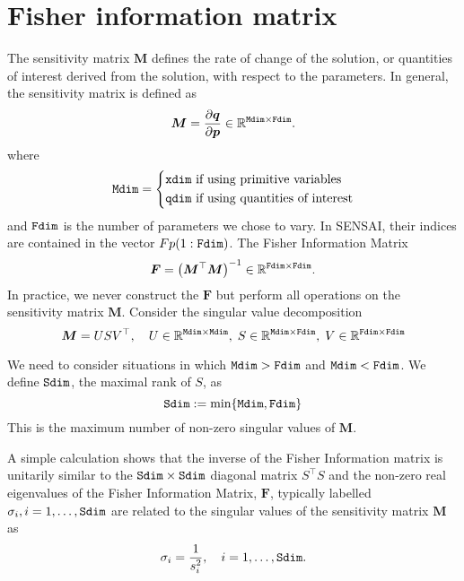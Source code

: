 \documentclass{siamltex}
\newcommand{\pvec}{\bm{p}}
\newcommand{\qvec}{\bm{q}}
\newcommand{\Fmat}{\bm{F}}
\newcommand{\Mmat}{\bm{M}}
\newcommand{\reals}{\mathbb R}
\newcommand{\xdim}{{\tt xdim}}
\newcommand{\qdim}{{\tt qdim}}
\newcommand{\Mdim}{{\tt Mdim}}
\newcommand{\Sdim}{{\tt Sdim}}
\newcommand{\Fdim}{{\tt Fdim}}
\begin{document}
\section{Fisher information matrix}
The sensitivity matrix $\Mmat$ defines the rate of change of the solution, or quantities of interest derived from the solution, with respect to the parameters. In general, the sensitivity matrix is defined as
\begin{equation}
\Mmat=\frac{\partial\qvec}{\partial\pvec} \in \reals^{\Mdim\times\Fdim}.
\end{equation}
where
\begin{equation}
\Mdim =
\left \{
\begin{gathered}\begin{aligned}
&\xdim \hbox{  if using primitive variables} \\
&\qdim \hbox{  if using quantities of interest}
\end{aligned}\end{gathered}
\right .
\end{equation}
and $\Fdim$ is the number of parameters we chose to vary. In SENSAI, their indices are contained in the vector $Fp(1:\Fdim)$. The Fisher Information Matrix
\begin{equation}
\Fmat = \left( \Mmat^\top \Mmat \right)^{-1} \in \reals^{\Fdim\times\Fdim}.
\end{equation}
In practice, we never construct the $\Fmat$ but perform all operations on the sensitivity matrix $\Mmat$. Consider the singular value decomposition
\begin{equation}
\Mmat=USV^\top, \quad U\in\reals^{\Mdim\times\Mdim},
\; S\in\reals^{\Mdim\times\Fdim}, \; V\in\reals^{\Fdim\times\Fdim}
\end{equation}

We need to consider situations in which $\Mdim > \Fdim$ and $\Mdim < \Fdim$. We define $\Sdim$, the maximal rank of $S$, as
\begin{equation}
\Sdim := \hbox{min} \{ \Mdim,\Fdim \}
\end{equation}
This is the maximum number of non-zero singular values of $\Mmat$.

A simple calculation shows that the inverse of the Fisher Information matrix is unitarily similar to the $\Sdim \times \Sdim$ diagonal matrix $S^\top S$  and the non-zero real eigenvalues of the Fisher Information Matrix, $\Fmat$, typically labelled $\sigma_i, i=1,\dots,\Sdim$ are related to the singular values of the sensitivity matrix $\Mmat$ as
\begin{equation}
\sigma_i = \frac{1}{s_i^2}, \quad i = 1,\dots,\Sdim.
\end{equation}
\end{document}
